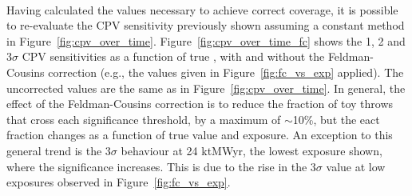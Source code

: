 \begin{figure*}[htbp]
  \centering
  \\
  \caption{Fraction of throws for which the DUNE sensitivity to CP-violation ($\deltacp \neq [0,\pm\pi]$) exceeds 1--3$\sigma$ significance, calculated using constant-\dchisq (dashed lines) and \dchisqcrit values calculated using the Feldman-Cousins method (shaded histograms), as a function of the true value of \deltacp. Shown for NO, for a number of different exposures. The number of throws used to make each figure is also shown.}
  \label{fig:cpv_over_time_fc}
\end{figure*}
Having calculated the \dchisqcrit values necessary to achieve correct coverage, it is possible to re-evaluate the CPV sensitivity previously shown assuming a constant \dchisq method in Figure~\ref{fig:cpv_over_time}. Figure~\ref{fig:cpv_over_time_fc} shows the 1, 2 and 3$\sigma$ CPV sensitivities as a function of true \deltacp, with and without the Feldman-Cousins correction (e.g., the \dchisqcrit values given in Figure~\ref{fig:fc_vs_exp} applied). The uncorrected values are the same as in Figure~\ref{fig:cpv_over_time}. In general, the effect of the Feldman-Cousins correction is to reduce the fraction of toy throws that cross each significance threshold, by a maximum of $\sim$10\%, but the eact fraction changes as a function of true \deltacp value and exposure. An exception to this general trend is the 3$\sigma$ behaviour at 24 ktMWyr, the lowest exposure shown, where the significance increases. This is due to the rise in the 3$\sigma$ \dchisqcrit value at low exposures observed in Figure~\ref{fig:fc_vs_exp}.

